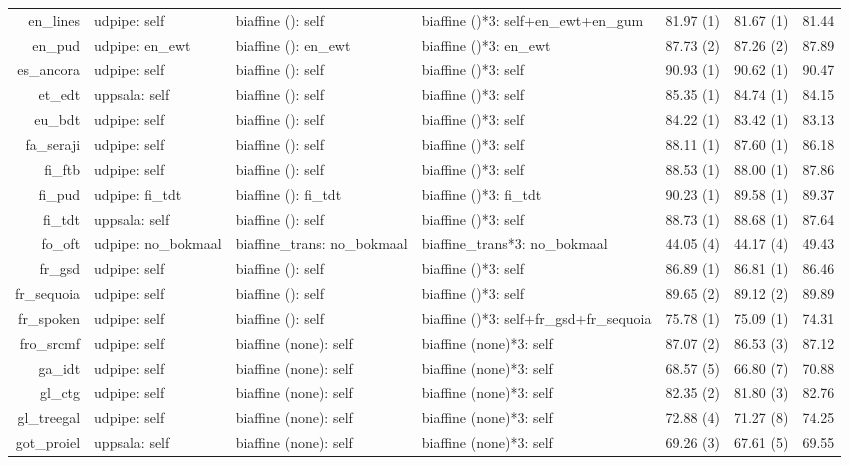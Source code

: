 \documentclass[11pt,a4paper]{article}
\begin{document}
\begin{table*}[t]
\begin{tabular}{rlllccc}
		en\_lines & udpipe: self & biaffine (): self & biaffine ()*3: self+en\_ewt+en\_gum & 81.97 (1) & 81.67 (1) & 81.44 \\
		en\_pud & udpipe: en\_ewt & biaffine (): en\_ewt & biaffine ()*3: en\_ewt & 87.73 (2) & 87.26 (2) & 87.89  \\
		es\_ancora & udpipe: self & biaffine (): self & biaffine ()*3: self & 90.93 (1) & 90.62 (1) & 90.47 \\
		et\_edt & uppsala: self & biaffine (): self & biaffine ()*3: self & 85.35 (1) & 84.74 (1) & 84.15 \\
		eu\_bdt & udpipe: self & biaffine (): self & biaffine ()*3: self & 84.22 (1) & 83.42 (1) & 83.13  \\
		fa\_seraji & udpipe: self & biaffine (): self & biaffine ()*3: self & 88.11 (1) & 87.60 (1) & 86.18  \\
		fi\_ftb & udpipe: self & biaffine (): self & biaffine ()*3: self & 88.53 (1) & 88.00 (1) & 87.86 \\
		fi\_pud & udpipe: fi\_tdt & biaffine (): fi\_tdt & biaffine ()*3: fi\_tdt & 90.23 (1) & 89.58 (1) & 89.37\\
		fi\_tdt & uppsala: self & biaffine (): self & biaffine ()*3: self & 88.73 (1) & 88.68 (1) & 87.64  \\
		fo\_oft & udpipe: no\_bokmaal & biaffine\_trans: no\_bokmaal & biaffine\_trans*3: no\_bokmaal & 44.05 (4)& 44.17 (4) & 49.43 \\
		fr\_gsd & udpipe: self & biaffine (): self & biaffine ()*3: self & 86.89 (1) & 86.81 (1) & 86.46 \\
		fr\_sequoia & udpipe: self & biaffine (): self & biaffine ()*3: self & 89.65 (2) & 89.12 (2) & 89.89\\
		fr\_spoken & udpipe: self & biaffine (): self & biaffine ()*3: self+fr\_gsd+fr\_sequoia & 75.78 (1) & 75.09 (1) & 74.31 \\
		fro\_srcmf & udpipe: self & biaffine (none): self & biaffine (none)*3: self & 87.07 (2) & 86.53 (3) & 87.12 \\
		ga\_idt & udpipe: self & biaffine (none): self & biaffine (none)*3: self & 68.57 (5) & 66.80 (7) & 70.88\\
		gl\_ctg & udpipe: self & biaffine (none): self & biaffine (none)*3: self & 82.35 (2) & 81.80 (3) & 82.76 \\
		gl\_treegal & udpipe: self & biaffine (none): self & biaffine (none)*3: self & 72.88 (4) & 71.27 (8) & 74.25 \\
		got\_proiel & uppsala: self & biaffine (none): self & biaffine (none)*3: self & 69.26 (3) & 67.61 (5) & 69.55 \\

\end{tabular}
\end{table*}
\end{document}
